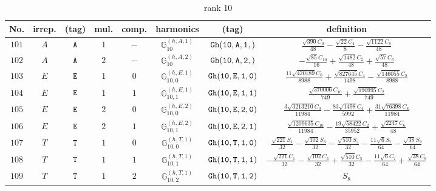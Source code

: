 \documentclass[fleqn,8pt]{jsarticle}
\begin{document}
\begin{table}[ht!]
\begin{center}
\caption{rank 10}
\renewcommand{\arraystretch}{1.3}
\begin{tabular}{cccccccc} \hline \hline
No. & irrep. & (tag) & mul. & comp. & harmonics & (tag) & definition \\ \hline
$ 101 $ & $ A $ & $ {\tt A} $ & $ 1 $ & $ - $ & $ \mathbb{G}_{10}^{(h,A,1)} $ & $ {\tt Gh(10,A,1,)} $ & $ \frac{\sqrt{390} C_{0}}{48} - \frac{\sqrt{22} C_{4}}{8} - \frac{\sqrt{1122} C_{8}}{48} $ \\
$ 102 $ & $ A $ & $ {\tt A} $ & $ 2 $ & $ - $ & $ \mathbb{G}_{10}^{(h,A,2)} $ & $ {\tt Gh(10,A,2,)} $ & $ - \frac{\sqrt{85} C_{10}}{16} + \frac{\sqrt{1482} C_{2}}{48} + \frac{\sqrt{57} C_{6}}{48} $ \\
$ 103 $ & $ E $ & $ {\tt E} $ & $ 1 $ & $ 0 $ & $ \mathbb{G}_{10,0}^{(h,E,1)} $ & $ {\tt Gh(10,E,1,0)} $ & $ \frac{11 \sqrt{420189} C_{0}}{8988} + \frac{\sqrt{827645} C_{4}}{1498} - \frac{\sqrt{146055} C_{8}}{8988} $ \\
$ 104 $ & $ E $ & $ {\tt E} $ & $ 1 $ & $ 1 $ & $ \mathbb{G}_{10,1}^{(h,E,1)} $ & $ {\tt Gh(10,E,1,1)} $ & $ \frac{\sqrt{370006} C_{10}}{749} + \frac{\sqrt{190995} C_{2}}{749} $ \\
$ 105 $ & $ E $ & $ {\tt E} $ & $ 2 $ & $ 0 $ & $ \mathbb{G}_{10,0}^{(h,E,2)} $ & $ {\tt Gh(10,E,2,0)} $ & $ \frac{3 \sqrt{3213210} C_{0}}{11984} - \frac{83 \sqrt{1498} C_{4}}{5992} + \frac{31 \sqrt{76398} C_{8}}{11984} $ \\
$ 106 $ & $ E $ & $ {\tt E} $ & $ 2 $ & $ 1 $ & $ \mathbb{G}_{10,1}^{(h,E,2)} $ & $ {\tt Gh(10,E,2,1)} $ & $ \frac{\sqrt{1209635} C_{10}}{11984} - \frac{19 \sqrt{58422} C_{2}}{35952} + \frac{\sqrt{2247} C_{6}}{48} $ \\
$ 107 $ & $ T $ & $ {\tt T} $ & $ 1 $ & $ 0 $ & $ \mathbb{G}_{10,0}^{(h,T,1)} $ & $ {\tt Gh(10,T,1,0)} $ & $ \frac{\sqrt{221} S_{1}}{32} - \frac{\sqrt{102} S_{3}}{32} - \frac{\sqrt{510} S_{5}}{32} - \frac{11 \sqrt{6} S_{7}}{64} - \frac{\sqrt{38} S_{9}}{64} $ \\
$ 108 $ & $ T $ & $ {\tt T} $ & $ 1 $ & $ 1 $ & $ \mathbb{G}_{10,1}^{(h,T,1)} $ & $ {\tt Gh(10,T,1,1)} $ & $ - \frac{\sqrt{221} C_{1}}{32} - \frac{\sqrt{102} C_{3}}{32} + \frac{\sqrt{510} C_{5}}{32} - \frac{11 \sqrt{6} C_{7}}{64} + \frac{\sqrt{38} C_{9}}{64} $ \\
$ 109 $ & $ T $ & $ {\tt T} $ & $ 1 $ & $ 2 $ & $ \mathbb{G}_{10,2}^{(h,T,1)} $ & $ {\tt Gh(10,T,1,2)} $ & $ S_{8} $ \\

\end{tabular}
\end{center}
\end{table}
\end{document}
